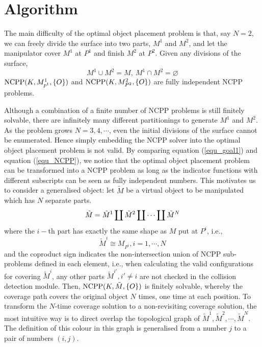 \documentclass[letterpaper,journal]{IEEEtran}
\begin{document}
\section{Algorithm}
\label{sectionalgorithm}
The main difficulty of the optimal object placement problem is that, say $N = 2$, we can freely divide the surface into two parts, $M^1$ and $M^2$, and let the manipulator cover $M^1$ at $P^1$ and finish $M^2$ at $P^2$. 
Given any divisions of the surface, 
\begin{equation}
M^1\cup M^2 = M,~M^1\cap M^2 = \varnothing
\end{equation}
${\rm NCPP}(K, M^1_{p^1}, \{O\})$ and ${\rm NCPP}(K, M^2_{P^2}, \{O\})$ are fully independent NCPP problems. 

Although a combination of a finite number of NCPP problems is still finitely solvable, there are infinitely many different partitionings to generate $M^1$ and $M^2$. As the problem grows $N = 3, 4, \cdots$, even the initial divisions of the surface cannot be enumerated. 
Hence simply embedding the NCPP solver into the optimal object placement problem is not valid. 
By comparing equation (\ref{equ_goal1}) and equation (\ref{equ_NCPP}), we notice that the optimal object placement problem can be transformed into a NCPP problem as long as the indicator functions with different subscripts can be seen as fully independent numbers. 
This motivates us to consider a generalised object: let $\tilde{M}$ be a virtual object to be manipulated which has $N$ separate parts. 
\begin{equation}
\tilde{M} = \tilde{M}^1\coprod\tilde{M}^2\coprod\cdots\coprod \tilde{M}^N\\
\end{equation}
where the $i-$th part has exactly the same shape as $M$ put at $P^i$, i.e., 
\begin{equation}
\tilde{M}^i \cong M_{P^i}, i = 1, \cdots, N
\end{equation}
and the coproduct sign indicates the non-intersection union of NCPP sub-problems defined in each element, i.e., when calculating the valid configurations for covering $\tilde{M}^i$, any other parts $\tilde{M}^{i'}, i'\neq i$ are not checked in the collision detection module. 
Then, ${\rm NCPP}(K, \tilde{M}, \{O\})$ is finitely solvable, whereby the coverage path covers the original object $N$ times, one time at each position. 
To transform the $N$-time coverage solution to a non-revisiting coverage solution, the most intuitive way is to direct overlap the topological graph of $\tilde{M}^1, \tilde{M}^2, \cdots, \tilde{M}^N$. The definition of this colour in this graph is generalised from a number $j$ to a pair of numbers $(i, j)$. 
\end{document}
